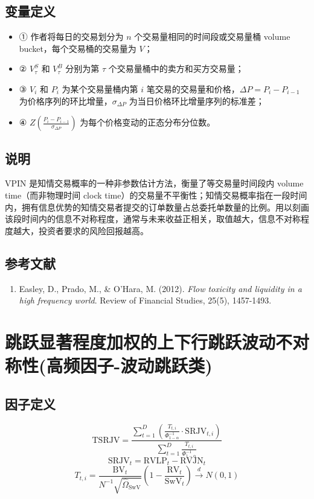 \documentclass{article}
\begin{document}
\subsection{变量定义}
\begin{itemize}
    \item ① 作者将每日的交易划分为 \( n \) 个交易量相同的时间段或交易量桶 volume bucket，每个交易桶的交易量为 \( V \)；
    \item ② \( V_\tau^S \) 和 \( V_\tau^B \) 分别为第 \( \tau \) 个交易量桶中的卖方和买方交易量；
    \item ③ \( V_i \) 和 \( P_i \) 为某个交易量桶内第 \( i \) 笔交易的交易量和价格，\( \Delta P = P_i - P_{i-1} \) 为价格序列的环比增量，\( \sigma_{\Delta P} \) 为当日价格环比增量序列的标准差；
    \item ④ \( Z \left( \frac{P_i - P_{i-1}}{\sigma_{\Delta P}} \right) \) 为每个价格变动的正态分布分位数。
\end{itemize}

\subsection{说明}
VPIN 是知情交易概率的一种非参数估计方法，衡量了等交易量时间段内 volume time（而非物理时间 clock time）的交易量不平衡性；知情交易概率指在一段时间内，拥有信息优势的知情交易者提交的订单数量占总委托单数量的比例。用以刻画该段时间内的信息不对称程度，通常与未来收益正相关，取值越大，信息不对称程度越大，投资者要求的风险回报越高。

\subsection{参考文献}
\begin{enumerate}
    \item Easley, D., Prado, M., \& O'Hara, M. (2012). \textit{Flow toxicity and liquidity in a high frequency world}. Review of Financial Studies, 25(5), 1457-1493.
\end{enumerate}

\section{跳跃显著程度加权的上下行跳跃波动不对称性(高频因子-波动跳跃类)}

\subsection{因子定义}
\begin{equation}
    \mathrm{TSRJV} = \frac{\sum_{t=1}^{D} \left( \frac{T_{t,i}}{\Phi^{-1}_{1-\alpha}} \cdot \mathrm{SRJV}_{t,i} \right)}{\sum_{t=1}^{D} \frac{T_{t,i}}{\Phi^{-1}_{1-\alpha}}}
\end{equation}
\begin{equation}
    \mathrm{SRJV}_t = \mathrm{RVLP}_t - \mathrm{RVJN}_t
\end{equation}
\begin{equation}
    T_{t,i} = \frac{\mathrm{BV}_t}{N^{-1}\sqrt{\hat{\Omega}_{\mathrm{SwV}}}} \left(1 - \frac{\mathrm{RV}_t}{\mathrm{SwV}_t}\right) \xrightarrow{d} N(0, 1)
\end{equation}
\end{document}
